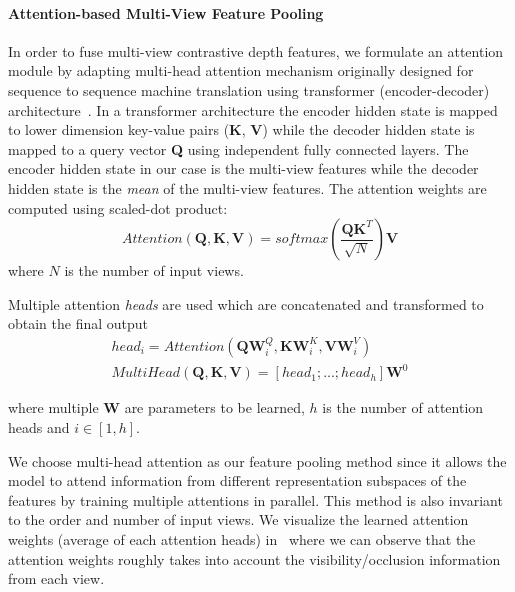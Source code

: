 \paragraph{Attention-based Multi-View Feature Pooling}
In order to fuse multi-view contrastive depth features, we formulate an attention module by adapting multi-head attention mechanism originally designed for sequence to sequence machine translation using transformer (encoder-decoder) architecture~\cite{vaswani2017attention}.
In a transformer architecture the encoder hidden state is mapped to lower dimension key-value pairs (\textbf{K}, \textbf{V})
while the decoder hidden state is mapped to a query vector \textbf{Q} using independent fully connected layers.
The encoder hidden state in our case is the multi-view features while the decoder hidden state is the \emph{mean} of the multi-view features.
The attention weights are computed using scaled-dot product:
\begin{equation}
    Attention(\mathbf{Q}, \mathbf{K}, \mathbf{V}) = softmax(\frac{\mathbf{Q} \mathbf{K}^{T}}{\sqrt{N}}) \mathbf{V}
    \label{equ:attention}
\end{equation}
\noindent where $N$ is the number of input views.

Multiple attention \emph{heads} are used which are concatenated and transformed to obtain the final output
\begin{align}
    head_i = Attention(\mathbf{Q} \mathbf{W}^{Q}_{i}, \mathbf{K} \mathbf{W}^{K}_{i}, \mathbf{V} \mathbf{W}^{V}_{i}) \label{equ:attention_head} \\
    MultiHead(\mathbf{Q}, \mathbf{K}, \mathbf{V}) = [head_1; ...; head_h] \mathbf{W}^0 \label{equ:multihead_attention}
\end{align}

\noindent where multiple $\mathbf{W}$ are parameters to be learned,
$h$ is the number of attention heads and $i\in[1,h]$.


We choose multi-head attention as our feature pooling method since it allows the model to attend information from different representation subspaces of the features by training multiple attentions in parallel.
This method is also invariant to the order and number of input views.
We visualize the learned attention weights (average of each attention heads) in~ where we can observe that the attention weights roughly takes into account the visibility/occlusion information from each view.
\vspace{-2mm}


